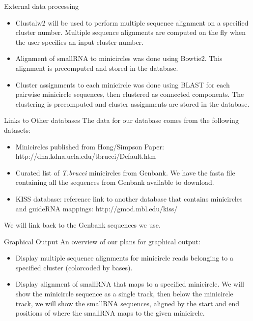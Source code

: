 \documentclass[a4paper,10pt,notitlepage]{article}
\begin{document}
\begin{section}{External data processing}
    \begin{itemize}
        \item Clustalw2 will be used to perform multiple sequence alignment on a specified cluster number. Multiple sequence 
            alignments are computed on the fly when the user specifies an input cluster number.
        \item Alignment of smallRNA to minicircles was done using Bowtie2. This alignment is precomputed and stored in the 
            database.
        \item Cluster assignments to each minicircle was done using BLAST for each pairwise minicircle sequences, then clustered 
            as connected components. The clustering is precomputed and cluster assignments are stored in the database.
    \end{itemize}
\end{section}

\begin{section}{Links to Other databases}
    The data for our database comes from the following datasets:

    \begin{itemize}
        \item Minicircles published from Hong/Simpson Paper: http://dna.kdna.ucla.edu/tbrucei/Default.htm
        \item Curated list of \emph{T.brucei} minicircles from Genbank. We have the fasta file containing all the sequences 
            from Genbank available to download.
        \item KISS database: reference link to another database that contains minicircles and guideRNA mappings: 
            http://gmod.mbl.edu/kiss/
    \end{itemize}

    We will link back to the Genbank sequences we use.

\end{section}

\begin{section}{Graphical Output}
    An overview of our plans for graphical output:

    \begin{itemize}
        \item Display multiple sequence alignments for minicircle reads belonging to a specified cluster (colorcoded by bases).
        \item Display alignment of smallRNA that maps to a specified minicircle. We will show the minicircle sequence as a 
            single track, then below the minicircle track, we will show the smallRNA sequences, aligned by the start and end 
            positions of where the smallRNA maps to the given minicircle. 
    \end{itemize}

\end{section}
            
\end{document}
